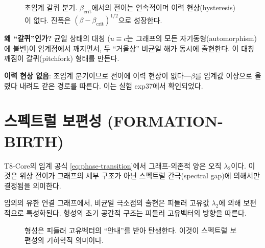 \begin{figure}[t]
\centering
\caption{초임계 갈퀴 분기. $\beta_{\mathrm{crit}}$에서의 전이는 연속적이며 이력 현상(hysteresis)이 없다. 진폭은 $(\beta - \beta_{\mathrm{crit}})^{1/2}$으로 성장한다.}
\label{fig:bifurcation}
\end{figure}

\textbf{왜 ``갈퀴''인가?} 균일 상태의 대칭 ($u \equiv c$는 그래프의 모든 자기동형(automorphism)에 불변)이 임계점에서 깨지면서, 두 ``거울상'' 비균일 해가 동시에 출현한다. 이 대칭 깨짐이 갈퀴(pitchfork) 형태를 만든다.

\textbf{이력 현상 없음}: 초임계 분기이므로 전이에 이력 현상이 없다---$\beta$를 임계값 이상으로 올렸다 내려도 같은 경로를 따른다. 이는 실험 exp37에서 확인되었다.


\section{스펙트럴 보편성 (FORMATION-BIRTH)}
\label{sec:spectral-universality}

T8-Core의 임계 공식 \eqref{eq:phase-transition}에서 그래프-의존적 양은 오직 $\lambda_2$이다. 이것은 위상 전이가 그래프의 세부 구조가 아닌 스펙트럴 간극(spectral gap)에 의해서만 결정됨을 의미한다.

\begin{theorem}
\label{thm:FORMATION-BIRTH}
임의의 유한 연결 그래프에서, 비균일 극소점의 출현은 피들러 고유값 $\lambda_2$에 의해 보편적으로 특성화된다. 형성의 초기 공간적 구조는 피들러 고유벡터의 방향을 따른다.
\end{theorem}

\begin{figure}[t]
\centering
\caption{형성은 피들러 고유벡터의 ``안내''를 받아 탄생한다. 이것이 스펙트럴 보편성의 기하학적 의미이다.}
\label{fig:fiedler-eigenvector}
\end{figure}

